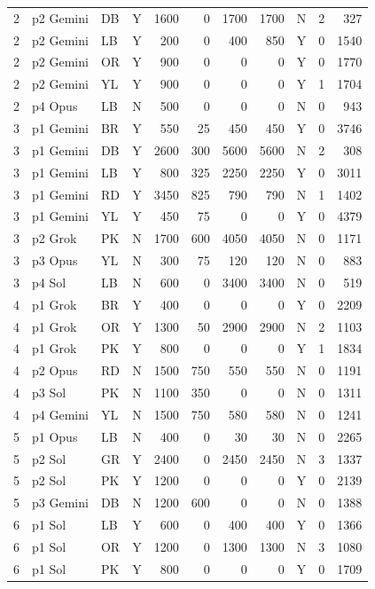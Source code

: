 \begin{longtable}{r l l l r r r r l r r}
2 & p2 Gemini & DB & Y & 1600 & 0 & 1700 & 1700 & N & 2 & 327 \\
2 & p2 Gemini & LB & Y & 200 & 0 & 400 & 850 & Y & 0 & 1540 \\
2 & p2 Gemini & OR & Y & 900 & 0 & 0 & 0 & Y & 0 & 1770 \\
2 & p2 Gemini & YL & Y & 900 & 0 & 0 & 0 & Y & 1 & 1704 \\
2 & p4 Opus & LB & N & 500 & 0 & 0 & 0 & N & 0 & 943 \\
3 & p1 Gemini & BR & Y & 550 & 25 & 450 & 450 & Y & 0 & 3746 \\
3 & p1 Gemini & DB & Y & 2600 & 300 & 5600 & 5600 & N & 2 & 308 \\
3 & p1 Gemini & LB & Y & 800 & 325 & 2250 & 2250 & Y & 0 & 3011 \\
3 & p1 Gemini & RD & Y & 3450 & 825 & 790 & 790 & N & 1 & 1402 \\
3 & p1 Gemini & YL & Y & 450 & 75 & 0 & 0 & Y & 0 & 4379 \\
3 & p2 Grok & PK & N & 1700 & 600 & 4050 & 4050 & N & 0 & 1171 \\
3 & p3 Opus & YL & N & 300 & 75 & 120 & 120 & N & 0 & 883 \\
3 & p4 Sol & LB & N & 600 & 0 & 3400 & 3400 & N & 0 & 519 \\
4 & p1 Grok & BR & Y & 400 & 0 & 0 & 0 & Y & 0 & 2209 \\
4 & p1 Grok & OR & Y & 1300 & 50 & 2900 & 2900 & N & 2 & 1103 \\
4 & p1 Grok & PK & Y & 800 & 0 & 0 & 0 & Y & 1 & 1834 \\
4 & p2 Opus & RD & N & 1500 & 750 & 550 & 550 & N & 0 & 1191 \\
4 & p3 Sol & PK & N & 1100 & 350 & 0 & 0 & N & 0 & 1311 \\
4 & p4 Gemini & YL & N & 1500 & 750 & 580 & 580 & N & 0 & 1241 \\
5 & p1 Opus & LB & N & 400 & 0 & 30 & 30 & N & 0 & 2265 \\
5 & p2 Sol & GR & Y & 2400 & 0 & 2450 & 2450 & N & 3 & 1337 \\
5 & p2 Sol & PK & Y & 1200 & 0 & 0 & 0 & Y & 0 & 2139 \\
5 & p3 Gemini & DB & N & 1200 & 600 & 0 & 0 & N & 0 & 1388 \\
6 & p1 Sol & LB & Y & 600 & 0 & 400 & 400 & Y & 0 & 1366 \\
6 & p1 Sol & OR & Y & 1200 & 0 & 1300 & 1300 & N & 3 & 1080 \\
6 & p1 Sol & PK & Y & 800 & 0 & 0 & 0 & Y & 0 & 1709 \\

\end{longtable}
